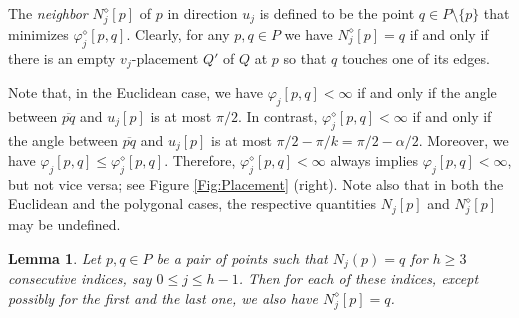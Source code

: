 \documentclass[letter,11pt]{article}
\newtheorem{lemma}[theorem]{Lemma}
\def\poly{\diamond}
\def\Nbrs{N}
\begin{document}
The \textit{neighbor} $\Nbrs^\poly_j[p]$ of $p$ in direction $u_j$ is defined to be the point $q\in
P\setminus\{p\}$ that minimizes $\varphi^\poly_j[p,q]$. Clearly, for any
$p,q\in P$ we have $\Nbrs^\poly_j[p]=q$ if and only if there is an empty
$v_j$-placement $Q'$ of $Q$ at $p$ so that $q$ touches one of
its edges. 




\smallskip
{}
Note that, in the Euclidean case, we have $\varphi_j[p,q]<\infty$ if
and only if the angle between $\overline{pq}$ and $u_j[p]$ is at most
$\pi/2$.  In contrast, $\varphi^\poly_j[p,q]<\infty$ if and only if
the angle between $\overline{pq}$ and $u_j[p]$ is at most
$\pi/2-\pi/k=\pi/2-\alpha/2$. Moreover, we have $\varphi_j[p,q]\leq
\varphi^\poly_j[p,q]$. Therefore, $\varphi^\poly_j[p,q]<\infty$ always
implies $\varphi_j[p,q]<\infty$, but not vice versa; see Figure
\ref{Fig:Placement} (right). Note also that in both the Euclidean and the polygonal cases, the respective quantities $N_j[p]$ and $N_j^\poly[p]$ may be undefined.


\begin{lemma}\label{Thm:LongEucPoly}
Let $p,q\in P$ be a pair of points such that $\Nbrs_j(p)=q$ for 
$h\geq 3$ consecutive indices, say $0\leq j\leq h-1$.
Then for each of these indices, except possibly for the first and the last one, we also have $\Nbrs^\poly_j[p]=q$.
\end{lemma}
\end{document}
